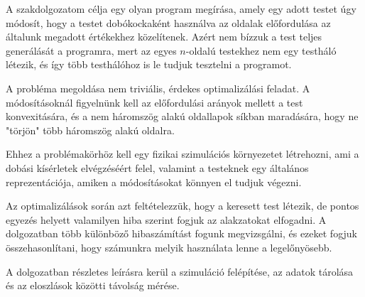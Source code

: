 
A szakdolgozatom célja egy olyan program megírása, amely egy adott testet úgy módosít, hogy a testet dobókockaként használva az oldalak előfordulása az általunk megadott értékekhez közelítenek.
Azért nem bízzuk a test teljes generálását a programra, mert az egyes $n$-oldalú testekhez nem egy testháló létezik, és így több testhálóhoz is le tudjuk tesztelni a programot.

A probléma megoldása nem triviális, érdekes optimalizálási feladat.
A módosításoknál figyelnünk kell az előfordulási arányok mellett a test konvexitására, és a nem háromszög alakú oldallapok síkban maradására, hogy ne "törjön" több háromszög alakú oldalra.

Ehhez a problémakörhöz kell egy fizikai szimulációs környezetet létrehozni, ami a dobási kísérletek elvégzéséért felel, valamint a testeknek egy általános reprezentációja, amiken a módosításokat könnyen el tudjuk végezni.

Az optimalizálások során azt feltételezzük, hogy a keresett test létezik, de pontos egyezés helyett valamilyen hiba szerint fogjuk az alakzatokat elfogadni.
A dolgozatban több különböző hibaszámítást fogunk megvizsgálni, és ezeket fogjuk összehasonlítani, hogy számunkra melyik használata lenne a legelőnyösebb.

A dolgozatban részletes leírásra kerül a szimuláció felépítése, az adatok tárolása és az eloszlások közötti távolság mérése.